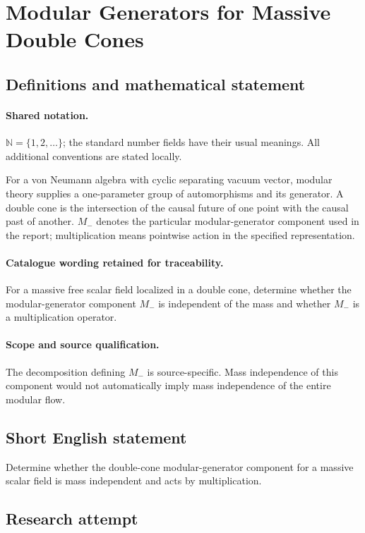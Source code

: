 \documentclass[11pt]{article}
\begin{document}
\section{Modular Generators for Massive Double Cones}\label{statement}

\subsection{Definitions and mathematical statement}

\paragraph{Shared notation.}$\mathbb N=\{1,2,\ldots\}$; the standard number fields have their usual meanings. All additional conventions are stated locally.


For a von Neumann algebra with cyclic separating vacuum vector, modular theory supplies a one-parameter group of automorphisms and its generator. A double cone is the intersection of the causal future of one point with the causal past of another. $M_-$ denotes the particular modular-generator component used in the report; multiplication means pointwise action in the specified representation.

\paragraph{Catalogue wording retained for traceability.}
For a massive free scalar field localized in a double cone, determine whether the modular-generator component $M_-$ is independent of the mass and whether $M_-$ is a multiplication operator.

\paragraph{Scope and source qualification.}The decomposition defining $M_-$ is source-specific. Mass independence of this component would not automatically imply mass independence of the entire modular flow.
\subsection{Short English statement}
Determine whether the double-cone modular-generator component for a massive scalar field is mass independent and acts by multiplication.
\subsection{Research attempt}
\end{document}
